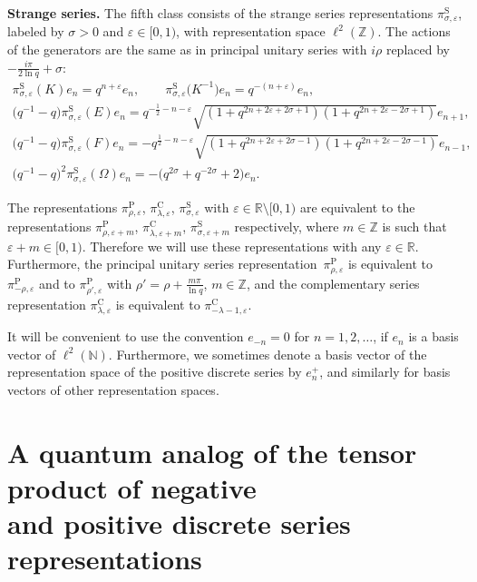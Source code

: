 \documentclass[pdftex]{sigma}
\numberwithin{equation}{section}
\numberwithin{theorem}{section}
\numberwithin{proposition}{section}
\numberwithin{lemma}{section}
\numberwithin{corollary}{section}
\numberwithin{definition}{section}
\numberwithin{example}{section}
\numberwithin{remark}{section}
\numberwithin{note}{section}
\newcommand{\R}{\mathbb R}
\newcommand{\N}{\mathbb N}
\newcommand{\Z}{\mathbb Z}
\newcommand{\eps}{\varepsilon}
\begin{document}
\textbf{Strange series.} The f\/ifth class consists of the strange series representations $\pi^{\mathrm S}_{\sigma,\eps}$, labeled by $\sigma>0$ and $\eps \in [0,1)$, with representation space $\ell^2(\Z)$. The actions of the generators are the same as in principal unitary series with $i\rho$ replaced by $- \frac{ i\pi}{2\ln q}+\sigma$:
\begin{gather}
\pi^{\mathrm S}_{\sigma,\eps}(K) e_n = q^{n+\eps} e_n, \qquad
\pi^{\mathrm S}_{\sigma,\eps} \big(K^{-1}\big) e_n = q^{-(n+\eps)} e_n,\nonumber\\
\big(q^{-1}-q\big)\pi^{\mathrm S}_{\sigma,\eps}(E) e_n
= q^{-\frac12-n-\eps} \sqrt{(1+q^{2n+2\eps+2\sigma+1})
(1+q^{2n+2\eps-2\sigma+1})} e_{n+1},\nonumber\\
\big(q^{-1}-q\big)\pi^{\mathrm S}_{\sigma,\eps}(F) e_n = -q^{\frac12-n-\eps}
\sqrt{(1+q^{2n+2\eps+2\sigma-1}) (1+q^{2n+2\eps-2\sigma-1})} e_{n-1},\nonumber\\
\big(q^{-1}-q\big)^2 \pi^{\mathrm S}_{\sigma,\eps} (\Omega) e_n =-\big(q^{2\sigma}+q^{-2\sigma} +2\big)e_n.\label{eq:strange}
\end{gather}

The representations $\pi^{\mathrm P}_{\rho,\eps}$, $\pi^{\mathrm C}_{\lambda,\eps}$, $\pi^{\mathrm S}_{\sigma,\eps}$ with $\eps \in \R\setminus [0,1)$ are equivalent to the representations $\pi^{\mathrm P}_{\rho,\eps+m}$,  $\pi^{\mathrm C}_{\lambda,\eps+m}$, $\pi^{\mathrm S}_{\sigma,\eps+m}$ respectively, where $m \in \Z$ is such that $\eps+m \in [0,1)$. Therefore we will use these representations with any $\eps \in \R$. Furthermore, the principal unitary series representation~$\pi_{\rho,\eps}^{\mathrm P}$ is equivalent to $\pi_{-\rho,\eps}^{\mathrm P}$ and to $\pi_{\rho',\eps}^{\mathrm P}$ with $\rho'=\rho+\frac{m\pi}{\ln q}$, $m \in \Z$, and the complementary series representation $\pi_{\lambda,\eps}^{\mathrm{C}}$ is equivalent to $\pi_{-\lambda-1,\eps}^{\mathrm{C}}$.

It will be convenient to use the convention $e_{-n}=0$ for $n=1,2,\ldots$, if $e_n$ is a basis vector of $\ell^2(\N)$. Furthermore, we sometimes denote a basis vector of the representation space of the positive discrete series by $e_n^+$, and similarly for basis vectors of other representation spaces.


\section{A quantum analog of the tensor product of negative\\ and positive discrete series representations} \label{sec:-+}
\end{document}
